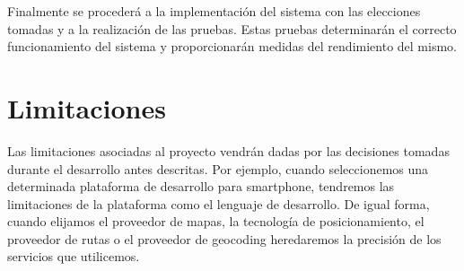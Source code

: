 Finalmente se procederá a la implementación del sistema con las elecciones tomadas y a la
realización de las pruebas. Estas pruebas determinarán el correcto funcionamiento del sistema y
proporcionarán medidas del rendimiento del mismo.

\section{Limitaciones}

Las limitaciones asociadas al proyecto vendrán dadas por las decisiones tomadas durante el
desarrollo antes descritas. Por ejemplo, cuando seleccionemos una determinada plataforma de
desarrollo para smartphone, tendremos las limitaciones de la plataforma como el lenguaje de
desarrollo. De igual forma, cuando elijamos el proveedor de mapas, la tecnología de posicionamiento,
el proveedor de rutas o el proveedor de geocoding heredaremos la precisión de los servicios que
utilicemos.

